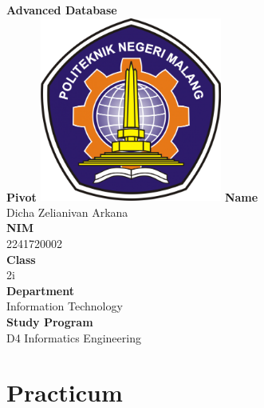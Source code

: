 \documentclass[12pt,titlepage]{article}
\newcommand{\vSubject}{Advanced Database}
\newcommand{\vSubtitle}{Pivot}
\newcommand{\vName}{Dicha Zelianivan Arkana}
\newcommand{\vNIM}{2241720002}
\newcommand{\vClass}{2i}
\newcommand{\vDepartment}{Information Technology}
\newcommand{\vStudyProgram}{D4 Informatics Engineering}
\begin{document}
\begin{titlepage}
    \centering
    \vfill
    {\bfseries\LARGE
        \vSubject\\
        \vskip0.25cm
        \vSubtitle
    }
    \vfill
    \includegraphics[width=6cm]{images/polinema-logo.png}
    \vfill
    {
        \textbf{Name}\\
        \vName\\
        \vskip0.5cm
        \textbf{NIM}\\
        \vNIM\\
        \vskip0.5cm
        \textbf{Class}\\
        \vClass\\
        \vskip0.5cm
        \textbf{Department}\\
        \vDepartment\\
        \vskip0.5cm
        \textbf{Study Program}\\
        \vStudyProgram
    }
\end{titlepage}

\section{Practicum}
\end{document}
